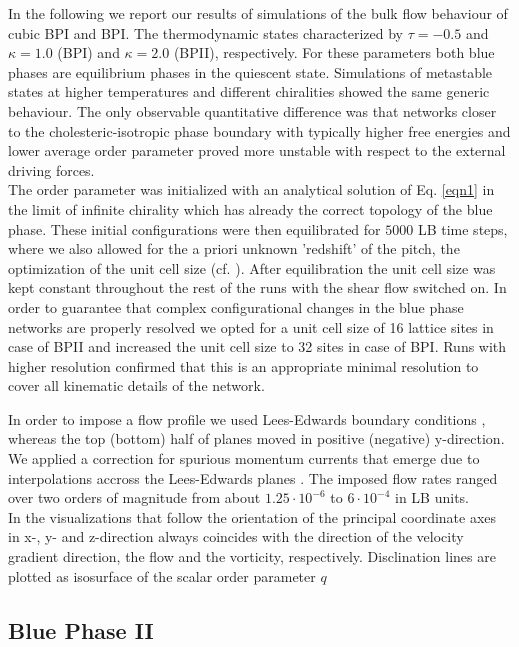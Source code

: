 \documentclass[aps,pre,onecolumn,groupedaddress]{revtex4-1}
\begin{document}
In the following we report our results of simulations of the bulk flow behaviour of cubic BPI and BPI.
The thermodynamic states characterized by $\tau=-0.5$ and $\kappa=1.0$ (BPI) and $\kappa=2.0$ (BPII), respectively.
For these parameters both blue phases are equilibrium phases in the quiescent state.
Simulations of metastable states at higher temperatures and different chiralities showed the same generic behaviour.
The only observable quantitative difference was that networks closer to the cholesteric-isotropic phase boundary with typically higher free energies and lower average order parameter proved more unstable with respect to the external driving forces.\\
The order parameter was initialized with an analytical solution of Eq. \ref{eqn1} in the limit of infinite chirality which has already the correct topology of the blue phase.
These initial configurations were then equilibrated for $5000$ LB time steps, where we also allowed for the a priori unknown 'redshift' of the pitch, the optimization of the unit cell size (cf. \cite{Alexander:2006}).
After equilibration the unit cell size was kept constant throughout the rest of the runs with the shear flow switched on.
In order to guarantee that complex configurational changes in the blue phase networks are properly resolved we opted for a unit cell size of 16 lattice sites in case of BPII and increased the unit cell size to 32 sites in case of BPI. Runs with higher resolution confirmed that this is an appropriate minimal resolution to cover all kinematic details of the network.

In order to impose a flow profile we used Lees-Edwards boundary conditions \cite{Wagner:2002}, whereas the top (bottom) half of planes moved in positive (negative) y-direction.
We applied a correction for spurious momentum currents that emerge due to interpolations accross the Lees-Edwards planes \cite{Henrich:2011b}.
The imposed flow rates ranged over two orders of magnitude from about $1.25\cdot 10^{-6}$ to $6\cdot10^{-4}$ in LB units.\\
In the visualizations that follow the orientation of the principal coordinate axes in x-, y- and z-direction always coincides with the direction of the velocity gradient direction, the flow and the vorticity, respectively.
Disclination lines are plotted as isosurface of the scalar order parameter $q$

\subsection{Blue Phase II}
\end{document}

